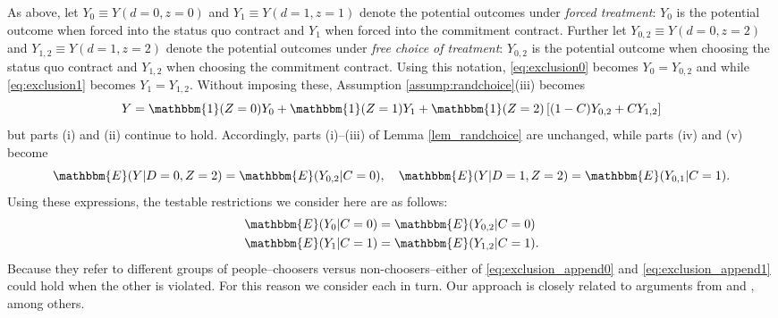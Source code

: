\begin{appendix}
As above, let $Y_0 \equiv Y(d=0,z=0)$ and $Y_1 \equiv Y(d=1,z=1)$ denote the potential outcomes under \emph{forced treatment}: $Y_0$ is the potential outcome when forced into the status quo contract and $Y_1$ when forced into the commitment contract. 
Further let $Y_{0,2} \equiv Y(d=0,z=2)$ and $Y_{1,2} \equiv Y(d=1,z=2)$ denote the potential outcomes under \emph{free choice of treatment}: $Y_{0,2}$ is the potential outcome when choosing the status quo contract and $Y_{1,2}$ when choosing the commitment contract. 
Using this notation, \eqref{eq:exclusion0} becomes $Y_0 = Y_{0,2}$ and while \eqref{eq:exclusion1} becomes $Y_1 = Y_{1,2}$.
Without imposing these, Assumption \ref{assump:randchoice}(iii) becomes 
\[
Y = \mathbbm{1}(Z =0) Y_{0} + \mathbbm{1}(Z = 1)  Y_{1}  + \mathbbm{1}(Z = 2) \left[(1 - C) Y_{0,2} + C Y_{1,2} \right]
\]
but parts (i) and (ii) continue to hold.
Accordingly, parts (i)--(iii) of Lemma \ref{lem_randchoice} are unchanged, while parts (iv) and (v) become
\[
\mathbbm{E}(Y|D=0,Z=2) = \mathbbm{E}(Y_{0,2}|C=0), \quad
\mathbbm{E}(Y|D=1,Z=2) = \mathbbm{E}(Y_{0,1}|C=1).
\]
Using these expressions, the testable restrictions we consider here are as follows:
\begin{align}
\label{eq:exclusion_append0}
\mathbbm{E}(Y_0|C=0) &= \mathbbm{E}(Y_{0,2}|C=0) \\
\label{eq:exclusion_append1}
\mathbbm{E}(Y_1|C=1) &= \mathbbm{E}(Y_{1,2}|C=1).
\end{align}
Because they refer to different groups of people--choosers versus non-choosers--either of \eqref{eq:exclusion_append0}  and \eqref{eq:exclusion_append1} could hold when the other is violated.
For this reason we consider each in turn.
Our approach is closely related to arguments from \cite{huber_mellace} and \cite{BinaryRegressor}, among others.


\end{appendix}
